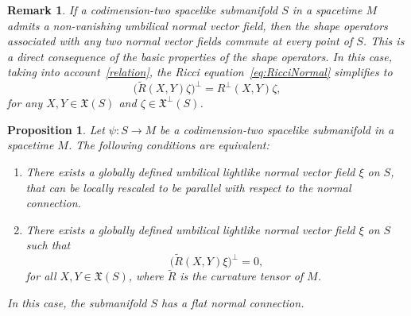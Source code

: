 \documentclass[11pt]{article}
\numberwithin{equation}{section}
\newtheorem{proposition}[theorem]{Proposition}
\newtheorem{remark}[theorem]{Remark}
\begin{document}
	
	\begin{remark}
		\normalfont
		If a codimension-two spacelike submanifold $S$ in a spacetime $M$ admits a non-vanishing umbilical normal vector field, then the shape operators associated with any two normal vector fields commute at every point of $S$. This is a direct consequence of the basic properties of the shape operators. In this case, taking into account~\eqref{relation}, the Ricci equation~\eqref{eq:RicciNormal} simplifies to
		\begin{equation}\label{eq:RSpacetimePerp}
			\bigl(\widetilde{R}(X,Y)\zeta\bigr)^\perp = R^\perp(X,Y)\zeta,
		\end{equation}
		for any $X, Y \in \mathfrak{X}(S)$ and $\zeta \in \mathfrak{X}^\perp(S)$.
	\end{remark}
	
	
	
	\begin{proposition}\label{CriterionParaUmbi}
		Let $\psi\colon S \to M$ be a codimension-two spacelike submanifold in a spacetime $M$. The following conditions are equivalent:
		\begin{enumerate}
			\item There exists a globally defined umbilical lightlike normal vector field $\xi$ on $S$, that can be locally rescaled to be parallel with respect to the normal connection.
			\item There exists a globally defined umbilical lightlike normal vector field $\xi$ on $S$ such that
			\begin{equation}\label{CurvatureRestric}
			\bigl(\widetilde{R}(X,Y)\xi\bigr)^\perp = 0,
		\end{equation}
			for all $X, Y \in \mathfrak{X}(S)$, where $\widetilde{R}$ is the curvature tensor of $M$.
		\end{enumerate}
		In this case, the submanifold $S$ has a flat normal connection.
	\end{proposition}
	
\end{document}
